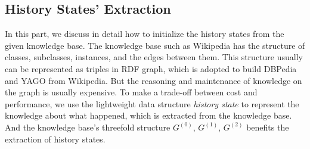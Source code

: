 \documentclass{article}
\begin{document}
\subsection{History States' Extraction}\label{subsec:hs_initialization}
In this part, we discuss in detail how to initialize the history states from the given knowledge base. 
The knowledge base such as Wikipedia has the structure of classes, subclasses, instances, and the edges between them. 
This structure usually can be represented as triples in RDF graph\cite{klyne2006rdf}, which is adopted to build DBPedia\cite{auer2007dbpedia} and YAGO\cite{suchanek2007yago} from Wikipedia. 
But the reasoning and maintenance of knowledge on the graph is usually expensive\cite{broekstra2003inferencing,bursztyn2015reasoning}. 
To make a trade-off between cost and performance, we use the lightweight data structure \textit{history state} to represent the knowledge about what happened, which is extracted from the knowledge base.
And the knowledge base's threefold structure \(G^{(0)}\), \(G^{(1)}\), \(G^{(2)}\) benefits the extraction of history states. 
\end{document}
